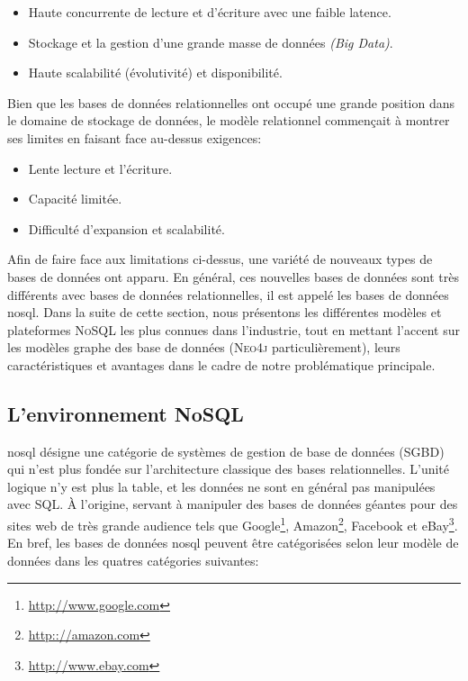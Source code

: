\begin{itemize} %
\item Haute concurrente de lecture et d'écriture avec une faible
  latence.
\item Stockage et la gestion d'une grande masse de données \emph{(Big
    Data)}.
\item Haute scalabilité (évolutivité) et disponibilité.
\end{itemize}

Bien que les bases de données relationnelles ont occupé une grande
position dans le domaine de stockage de données, le modèle relationnel
commençait à montrer ses limites en faisant face au-dessus exigences:

\begin{itemize} %
\item Lente lecture et l'écriture.
\item Capacité limitée.
\item Difficulté d'expansion et scalabilité.
\end{itemize}

Afin de faire face aux limitations ci-dessus, une variété de nouveaux
types de bases de données ont apparu. En général, ces nouvelles bases
de données sont très différents avec bases de données relationnelles,
il est appelé les bases de données \acrshort{nosql}. Dans la suite de
cette section, nous présentons les différentes modèles et plateformes
\textsc{NoSQL} les plus connues dans l'industrie, tout en mettant
l'accent sur les modèles graphe des base de données (\textsc{Neo4j}
particulièrement), leurs caractéristiques et avantages dans le cadre
de notre problématique principale.

  \subsection{L'environnement NoSQL}
  \label{sec:nosql}
  \acrshort{nosql} désigne une catégorie de systèmes de gestion de
  base de données (\acrshort{SGBD}) qui n'est plus fondée sur
  l'architecture classique des bases relationnelles. L'unité logique
  n'y est plus la table, et les données ne sont en général pas
  manipulées avec \textsc{SQL}. À l'origine, servant à manipuler des
  bases de données géantes pour des sites web de très grande audience
  tels que Google\footnote{\url{http://www.google.com}},
  Amazon\footnote{\url{http:://amazon.com}}, Facebook et
  eBay\footnote{\url{http://www.ebay.com}}. En bref, les bases de
  données \acrshort{nosql} peuvent être catégorisées selon leur modèle
  de données dans les quatres catégories suivantes:

